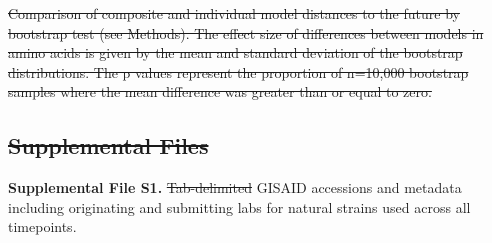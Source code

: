 \documentclass[9pt,lineno]{elife} %
\providecommand{\DIFdel}[1]{{\protect\color{red}\sout{#1}}}                      %
\providecommand{\DIFdelbegin}{} %
\providecommand{\DIFdelend}{} %
\providecommand{\DIFdelFL}[1]{\DIFdel{#1}} %
\providecommand{\DIFdeltex}[1]{{\protect\color{red}\sout{#1}}}                      %
\providecommand{\DIFdelbegin}{} %
\providecommand{\DIFdelend}{} %
\providecommand{\DIFdelFL}[1]{\DIFdel{#1}} %
\providecommand{\DIFdel}[1]{\texorpdfstring{\DIFdeltex{#1}}{}} %
\newcommand{\DIFscaledelfig}{0.5}
\newlength{\DIFdelgraphicswidth} %
\newlength{\DIFdelgraphicsheight} %
\newcommand{\DIFdelincludegraphics}[2][]{%
\sbox{\DIFdelgraphicsbox}{\DIFOincludegraphics[#1]{#2}}%
\settoboxwidth{\DIFdelgraphicswidth}{\DIFdelgraphicsbox} %
\settoboxtotalheight{\DIFdelgraphicsheight}{\DIFdelgraphicsbox} %
\scalebox{\DIFscaledelfig}{%
\parbox[b]{\DIFdelgraphicswidth}{\usebox{\DIFdelgraphicsbox}\\[-\baselineskip] \rule{\DIFdelgraphicswidth}{0em}}\llap{\resizebox{\DIFdelgraphicswidth}{\DIFdelgraphicsheight}{%
\setlength{\unitlength}{\DIFdelgraphicswidth}%
\begin{picture}(1,1)%
\thicklines\linethickness{2pt} %
{\color[rgb]{1,0,0}\put(0,0){\framebox(1,1){}}}%
{\color[rgb]{1,0,0}\put(0,0){\line( 1,1){1}}}%
{\color[rgb]{1,0,0}\put(0,1){\line(1,-1){1}}}%
\end{picture}%
}\hspace*{3pt}}} %
} %
\DeclareRobustCommand{\DIFdelbegin}{\DIFOdelbegin \let\includegraphics\DIFdelincludegraphics} %
\DeclareRobustCommand{\DIFdelend}{\DIFOaddend \let\includegraphics\DIFOincludegraphics} %
\begin{document}
{%
\DIFdelFL{Comparison of composite and individual model distances to the future by bootstrap test (see Methods).
      The effect size of differences between models in amino acids is given by the mean and standard deviation of the bootstrap distributions.
      The p values represent the proportion of n=10,000 bootstrap samples where the mean difference was greater than or equal to zero.
    }}

\subsection*{\DIFdel{Supplemental Files}}

\DIFdelend \textbf{Supplemental File S1.} \DIFdelbegin \DIFdel{Tab-delimited }\DIFdelend GISAID accessions and metadata including originating and submitting labs for natural strains used across all timepoints.
\end{document}
